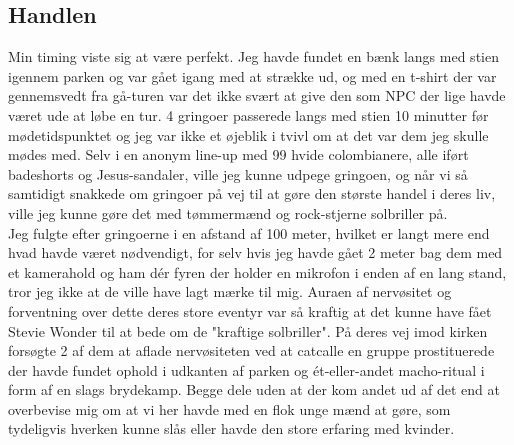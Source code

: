 \documentclass[danish]{article}
\begin{document}
\begin{multicols}{2}
\section*{Handlen}
Min timing viste sig at være perfekt. Jeg havde fundet en bænk langs med stien igennem parken og var gået igang med at strække ud, og med en t-shirt der var gennemsvedt fra gå-turen var det ikke svært at give den som NPC der lige havde været ude at løbe en tur. 4 gringoer passerede langs med stien 10 minutter før mødetidspunktet og jeg var ikke et øjeblik i tvivl om at det var dem jeg skulle mødes med. Selv i en anonym line-up med 99 hvide colombianere, alle iført badeshorts og Jesus-sandaler, ville jeg kunne udpege gringoen, og når vi så samtidigt snakkede om gringoer på vej til at gøre den største handel i deres liv, ville jeg kunne gøre det med tømmermænd og rock-stjerne solbriller på.\\
Jeg fulgte efter gringoerne i en afstand af 100 meter, hvilket er langt mere end hvad havde været nødvendigt, for selv hvis jeg havde gået 2 meter bag dem med et kamerahold og ham dér fyren der holder en mikrofon i enden af en lang stand, tror jeg ikke at de ville have lagt mærke til mig. Auraen af nervøsitet og forventning over dette deres store eventyr var så kraftig at det kunne have fået Stevie Wonder til at bede om de "kraftige solbriller". På deres vej imod kirken forsøgte 2 af dem at aflade nervøsiteten ved at catcalle en gruppe prostituerede der havde fundet ophold i udkanten af parken og ét-eller-andet macho-ritual i form af en slags brydekamp. Begge dele uden at der kom andet ud af det end at overbevise mig om at vi her havde med en flok unge mænd at gøre, som tydeligvis hverken kunne slås eller havde den store erfaring med kvinder.\\ 







\end{multicols}
\end{document}
